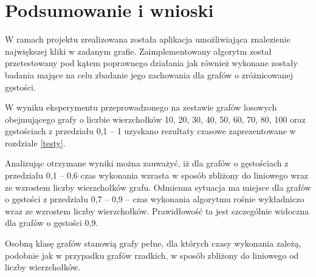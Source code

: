 \documentclass[12pt, a4paper]{article}
\begin{document}
\section{Podsumowanie i wnioski}
W ramach projektu zrealizowana została aplikacja umożliwiająca znalezienie największej kliki w zadanym grafie. Zaimplementowany algorytm został przetestowany pod kątem poprawnego działania jak również wykonane zostały badania mające na celu zbadanie jego zachowania dla grafów o zróżnicowanej gęstości.

W wyniku eksperymentu przeprowadzonego na zestawie grafów losowych obejmującego grafy o liczbie wierzchołków 10, 20, 30, 40, 50, 60, 70, 80, 100 oraz gęstościach z przedziału 0,1 -- 1 uzyskano rezultaty czasowe zaprezentowane w rozdziale \ref{testy}.

Analizując otrzymane wyniki można zauważyć, iż dla grafów o gęstościach z przedziału 0,1 -- 0,6 czas wykonania wzrasta w sposób zbliżony do liniowego wraz ze wzrostem liczby wierzchołków grafu. Odmienna sytuacja ma miejsce dla grafów o gęstości z przedziału 0,7 -- 0,9 -- czas wykonania algorytmu rośnie wykładniczo wraz ze wzrostem liczby wierzchołków. Prawidłowość ta jest szczególnie widoczna dla grafów o gęstości 0,9. 

Osobną klasę grafów stanowią grafy pełne, dla których czasy wykonania zależą, podobnie jak w przypadku grafów rzadkich, w sposób zbliżony do liniowego od liczby wierzchołków.
\end{document}
